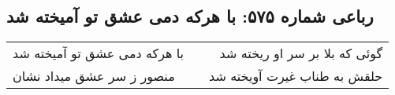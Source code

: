 \begin{center}
\section*{رباعی شماره ۵۷۵: با هرکه دمی عشق تو آمیخته شد}
\label{sec:0575}
\begin{longtable}{l p{0.5cm} r}
با هرکه دمی عشق تو آمیخته شد
&&
گوئی که بلا بر سر او ریخته شد
\\
منصور ز سر عشق میداد نشان
&&
حلقش به طناب غیرت آویخته شد
\\
\end{longtable}
\end{center}

